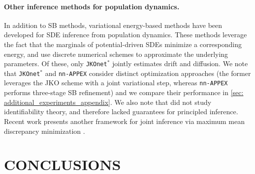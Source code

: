 \documentclass[twoside]{article}
\newcommand{\jkonetstar}{\texttt{JKOnet}$^\ast$}
\newcommand{\nappex}{\texttt{nn-APPEX}}
\begin{document}
\paragraph{Other inference methods for population dynamics.}
In addition to SB methods, variational energy-based methods \citep{hashimoto2016learning,bunne2022proximal,neklyudov2023action, terpin2024learning, persiianov2025learning} have been developed for SDE inference from population dynamics. These methods leverage the fact that the marginals of potential-driven SDEs minimize a corresponding energy, and use discrete numerical schemes to approximate the underlying parameters. Of these, only \jkonetstar{} \citep{terpin2024learning} jointly estimates drift and diffusion. We note that \jkonetstar{} and \nappex{} consider distinct optimization approaches (the former leverages the JKO scheme \citep{jordan1998variational} with a joint variational step, whereas \nappex{} performs three-stage SB refinement) and we compare their performance in \cref{sec: additional_experiments_appendix}. We also note that \citet{terpin2024learning} did not study identifiability theory, and therefore lacked guarantees for principled inference. Recent work presents another framework for joint inference via maximum mean discrepancy minimization \citep{berlinghieri2025oh}.



\section{CONCLUSIONS}
\label{sec:conclusions}
\end{document}
